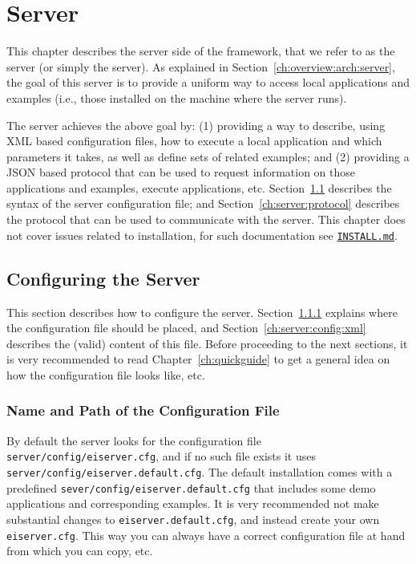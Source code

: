 {%
}
\chapter{\ei Server}
\label{ch:server}

This chapter describes the server side of the \ei framework, that we
refer to as the \ei server (or simply the server).
%
As explained in Section~\ref{ch:overview:arch:server}, the goal of
this server is to provide a uniform way to access local applications
and examples (i.e., those installed on the machine where the server
runs).


The \ei server achieves the above goal by:
%
(1) providing a way to describe, using XML based configuration files,
how to execute a local application and which parameters it takes, as
well as define sets of related examples; and
%
(2) providing a JSON based protocol that can be used to request
information on those applications and examples, execute applications,
etc.
%
Section~\ref{ch:server:config} describes the syntax of the server
configuration file; and Section~\ref{ch:server:protocol} describes the
protocol that can be used to communicate with the server.
%
This chapter does not cover issues related to installation, for such
documentation see
\texttt{\href{http://github.com/abstools/easyinterface}{INSTALL.md}}.


\section{Configuring the \ei Server}
\label{ch:server:config}

This section describes how to configure the \ei server.
%
Section~\ref{ch:server:config:file} explains where the configuration
file should be placed, and Section~\ref{ch:server:config:xml}
describes the (valid) content of this file.
%
Before proceeding to the next sections, it is very recommended to read
Chapter~\ref{ch:quickguide} to get a general idea on how the
configuration file looks like, etc.


\subsection{Name and Path of the Configuration File}
\label{ch:server:config:file}

By default the server looks for the configuration file
\texttt{server/config/eiserver.cfg}, and if no such file exists it
uses \texttt{server/config/eiserver.default.cfg}.
%
The default installation comes with a predefined
\texttt{sever/config/eiserver.default.cfg} that includes some demo
applications and corresponding examples. It is very recommended not
make substantial changes to \texttt{eiserver.default.cfg}, and instead
create your own \texttt{eiserver.cfg}. This way you can always have a
correct configuration file at hand from which you can copy, etc.

